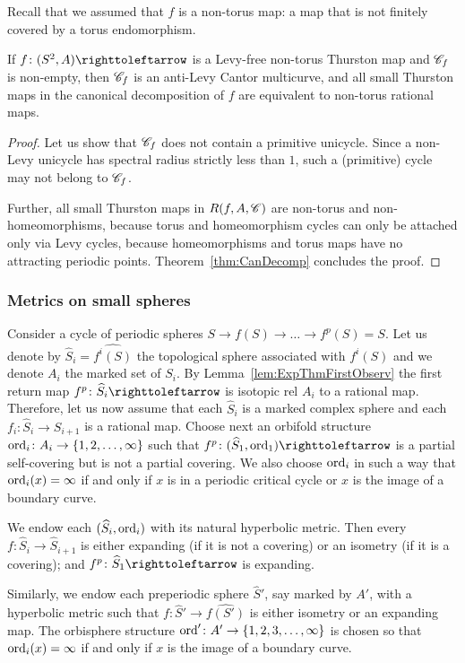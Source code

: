 \documentclass{amsart}
\begin{document}
Recall that we assumed that $f$ is a non-torus map: a map that is not
finitely covered by a torus endomorphism.
\begin{lem}\label{lem:ExpThmFirstObserv}
  If $f\colon(S^2,A)\selfmap$ is a Levy-free non-torus Thurston map
  and ${\mathscr C}_f$ is non-empty, then ${\mathscr C}_f$ is an anti-Levy Cantor
  multicurve, and all small Thurston maps in the canonical
  decomposition of $f$ are equivalent to non-torus rational maps.
\end{lem}
\begin{proof}
  Let us show that ${\mathscr C}_f$ does not contain a primitive
  unicycle. Since a non-Levy unicycle has spectral radius strictly
  less than $1$, such a (primitive) cycle may not belong to ${\mathscr C}_f$.

  Further, all small Thurston maps in $R(f,A,{\mathscr C})$ are non-torus and
  non-homeomorphisms, because torus and homeomorphism cycles can only
  be attached only via Levy cycles, because homeomorphisms and torus
  maps have no attracting periodic points. Theorem~\ref{thm:CanDecomp}
  concludes the proof.
\end{proof}

\subsubsection{Metrics on small spheres}
Consider a cycle of periodic spheres $S\to f(S)\to\dots\to
f^p(S)=S$. Let us denote by $\widehat S_i=\widehat{f^i(S)}$ the
topological sphere associated with $f^i(S)$ and we denote $A_i$ the
marked set of $S_i$. By Lemma~\ref{lem:ExpThmFirstObserv} the first
return map $f^p\colon \widehat S_i\selfmap$ is isotopic rel $A_i$ to a
rational map. Therefore, let us now assume that each $\widehat S_i$ is
a marked complex sphere and each $f_i\colon \widehat S_i\to S_{i+1}$
is a rational map. Choose next an orbifold structure
$\operatorname{ord}_i\colon A_i\to \{1,2,\dots, \infty\}$ such that
$f^p\colon (\widehat S_1,\ord_1)\selfmap$ is a partial self-covering
but is not a partial covering. We also choose $\operatorname{ord}_i$ in such a way
that $\operatorname{ord}_i(x)=\infty$ if and only if $x$ is in a periodic critical
cycle or $x$ is the image of a boundary curve.

We endow each $(\widehat S_i,\operatorname{ord}_i)$ with its natural hyperbolic
metric. Then every $f\colon \widehat S_i\to \widehat S_{i+1}$ is
either expanding (if it is not a covering) or an isometry (if it is a
covering); and $f^p\colon \widehat S_1\selfmap$ is expanding.
 
Similarly, we endow each preperiodic sphere $\widehat S'$, say marked
by $A'$, with a hyperbolic metric such that
$f\colon \widehat S'\to \widehat {f(S')}$ is either isometry or an
expanding map. The orbisphere structure
$\operatorname{ord}'\colon A'\to \{1,2,3,\dots, \infty\}$ is chosen so that
$\operatorname{ord}_i(x)=\infty$ if and only if $x$ is the image of a boundary
curve.
 
\end{document}
